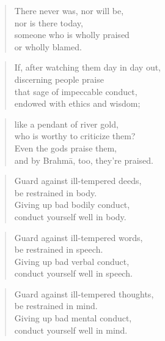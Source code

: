 \documentclass[12pt,openany]{book}%
\begin{document}
\begin{verse}%
There never was, nor will be, \\
nor is there today, \\
someone who is wholly praised \\
or wholly blamed. 

%
\end{verse}

\begin{verse}%
If, after watching them day in day out, \\
discerning people praise \\
that sage of impeccable conduct, \\
endowed with ethics and wisdom; 

%
\end{verse}

\begin{verse}%
like a pendant of river gold, \\
who is worthy to criticize them? \\
Even the gods praise them, \\
and by \textsanskrit{Brahmā}, too, they’re praised. 

%
\end{verse}

\begin{verse}%
Guard against ill-tempered deeds, \\
be restrained in body. \\
Giving up bad bodily conduct, \\
conduct yourself well in body. 

%
\end{verse}

\begin{verse}%
Guard against ill-tempered words, \\
be restrained in speech. \\
Giving up bad verbal conduct, \\
conduct yourself well in speech. 

%
\end{verse}

\begin{verse}%
Guard against ill-tempered thoughts, \\
be restrained in mind. \\
Giving up bad mental conduct, \\
conduct yourself well in mind. 

%
\end{verse}
\end{document}
